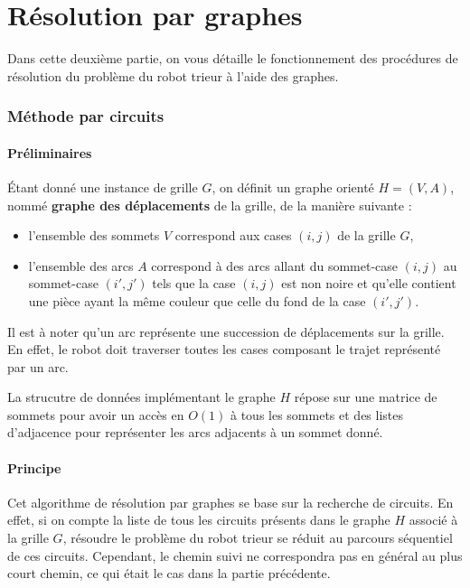 \documentclass[12pt,a4paper]{article}
\begin{document}
\newpage

\part{R\'esolution par graphes}
Dans cette deuxi\`eme partie, on vous d\'etaille le fonctionnement des 
proc\'edures de r\'esolution du probl\`eme du robot trieur \`a l'aide des 
graphes.

\section{M\'ethode par circuits}
\subsection*{Pr\'eliminaires}
\'Etant donn\'e une instance de grille $G$, on d\'efinit un graphe orient\'e $H 
= (V,A)$, nomm\'e {\bfseries graphe des d\'eplacements} de la grille, de la 
mani\`ere suivante :
\begin{itemize}
\item l'ensemble des sommets $V$ correspond aux cases $(i,j)$ de la grille $G$,
\item l'ensemble des arcs $A$ correspond \`a des arcs allant du 
sommet-case $(i,j)$ au sommet-case $(i',j')$ tels que la case $(i,j)$ est non 
noire et qu'elle contient une pi\`ece ayant la m\^eme couleur que celle du fond 
de la case $(i',j')$.
\end{itemize}

Il est \`a noter qu'un arc repr\'esente une succession de d\'eplacements sur la 
grille. En effet, le robot doit traverser toutes les cases composant le trajet 
repr\'esent\'e par un arc.

La strucutre de donn\'ees impl\'ementant le graphe $H$ r\'epose sur une matrice 
de sommets pour avoir un acc\`es en $O(1)$ \`a tous les sommets et des listes 
d'adjacence pour repr\'esenter les arcs adjacents \`a un sommet donn\'e. 

\subsection*{Principe}
Cet algorithme de r\'esolution par graphes se base sur la recherche de 
circuits. En effet, si on compte la liste de tous les circuits pr\'esents dans 
le graphe $H$ associ\'e \`a la grille $G$, r\'esoudre le probl\`eme du robot 
trieur se r\'eduit au parcours s\'equentiel de ces circuits. Cependant, le 
chemin suivi ne correspondra pas en g\'en\'eral au plus court chemin, ce qui 
\'etait le cas dans la partie pr\'ec\'edente.
\end{document}

